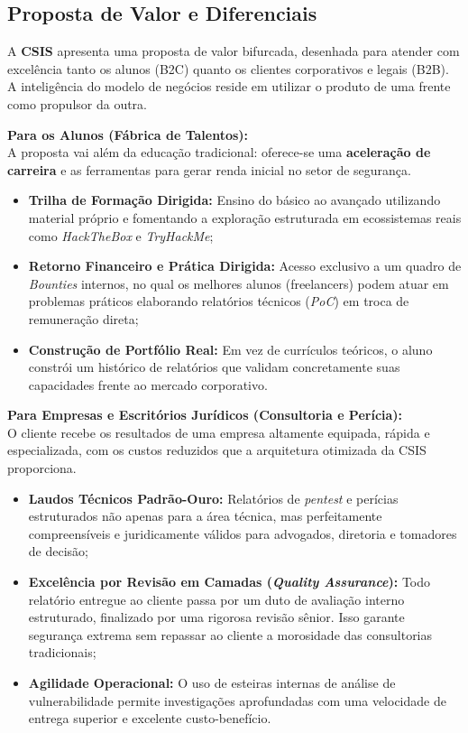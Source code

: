 \documentclass[../main.tex]{subfiles}
\begin{document}
\subsection{Proposta de Valor e Diferenciais}

A \textbf{CSIS} apresenta uma proposta de valor bifurcada, desenhada para atender com excelência tanto os alunos (B2C) quanto os clientes corporativos e legais (B2B). A inteligência do modelo de negócios reside em utilizar o produto de uma frente como propulsor da outra.

\textbf{Para os Alunos (Fábrica de Talentos):}\\
A proposta vai além da educação tradicional: oferece-se uma \textbf{aceleração de carreira} e as ferramentas para gerar renda inicial no setor de segurança.
\begin{itemize}
  \item \textbf{Trilha de Formação Dirigida:} Ensino do básico ao avançado utilizando material próprio e fomentando a exploração estruturada em ecossistemas reais como \textit{HackTheBox} e \textit{TryHackMe};
  \item \textbf{Retorno Financeiro e Prática Dirigida:} Acesso exclusivo a um quadro de \textit{Bounties} internos, no qual os melhores alunos (freelancers) podem atuar em problemas práticos elaborando relatórios técnicos (\textit{PoC}) em troca de remuneração direta;
  \item \textbf{Construção de Portfólio Real:} Em vez de currículos teóricos, o aluno constrói um histórico de relatórios que validam concretamente suas capacidades frente ao mercado corporativo.
\end{itemize}

\textbf{Para Empresas e Escritórios Jurídicos (Consultoria e Perícia):}\\
O cliente recebe os resultados de uma empresa altamente equipada, rápida e especializada, com os custos reduzidos que a arquitetura otimizada da CSIS proporciona.
\begin{itemize}
  \item \textbf{Laudos Técnicos Padrão-Ouro:} Relatórios de \textit{pentest} e perícias estruturados não apenas para a área técnica, mas perfeitamente compreensíveis e juridicamente válidos para advogados, diretoria e tomadores de decisão;
  \item \textbf{Excelência por Revisão em Camadas (\textit{Quality Assurance}):} Todo relatório entregue ao cliente passa por um duto de avaliação interno estruturado, finalizado por uma rigorosa revisão sênior. Isso garante segurança extrema sem repassar ao cliente a morosidade das consultorias tradicionais;
  \item \textbf{Agilidade Operacional:} O uso de esteiras internas de análise de vulnerabilidade permite investigações aprofundadas com uma velocidade de entrega superior e excelente custo-benefício.
\end{itemize}
\end{document}
